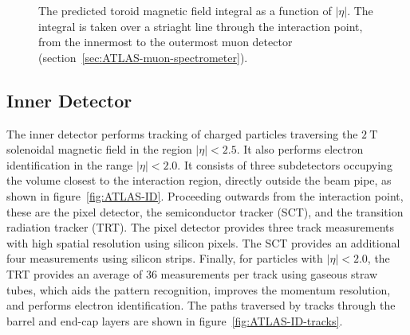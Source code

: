 \begin{figure}[htbp]
	\centering
	\caption{The predicted toroid magnetic field integral as a function of $|\eta|$. The integral is taken over a striaght line through the interaction point, from the innermost to the outermost muon detector (section~\ref{sec:ATLAS-muon-spectrometer}).}
	\label{fig:ATLAS-toroid-Bintegral}
\end{figure}



\subsection{Inner Detector}\label{sec:ATLAS-inner-detector}

The inner detector performs tracking of charged particles traversing the $2~\mbox{T}$ solenoidal magnetic field in the region $|\eta|<2.5$. It also performs electron identification in the range $|\eta|<2.0$. It consists of three subdetectors occupying the volume closest to the interaction region, directly outside the beam pipe, as shown in figure~\ref{fig:ATLAS-ID}. Proceeding outwards from the interaction point, these are the pixel detector, the semiconductor tracker (SCT), and the transition radiation tracker (TRT). The pixel detector provides three track measurements with high spatial resolution using silicon pixels. The SCT provides an additional four measurements using silicon strips. Finally, for particles with $|\eta|<2.0$, the TRT provides an average of 36 measurements per track using gaseous straw tubes, which aids the pattern recognition, improves the momentum resolution, and performs electron identification. The paths traversed by tracks through the barrel and end-cap layers are shown in figure~\ref{fig:ATLAS-ID-tracks}.


